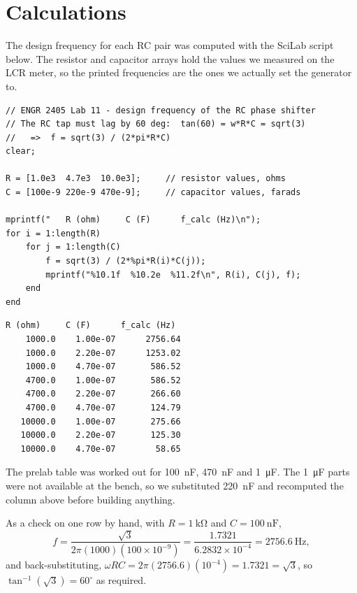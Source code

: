 \documentclass[11pt]{article}
\begin{document}
\section*{Calculations}
The design frequency for each RC pair was computed with the SciLab script below.
The resistor and capacitor arrays hold the values we measured on the LCR meter,
so the printed frequencies are the ones we actually set the generator to.

\begin{lstlisting}[style=scilab, caption={SciLab program \texttt{lab11\_freq.sce}.}]
// ENGR 2405 Lab 11 - design frequency of the RC phase shifter
// The RC tap must lag by 60 deg:  tan(60) = w*R*C = sqrt(3)
//   =>  f = sqrt(3) / (2*pi*R*C)
clear;

R = [1.0e3  4.7e3  10.0e3];     // resistor values, ohms
C = [100e-9 220e-9 470e-9];     // capacitor values, farads

mprintf("   R (ohm)     C (F)      f_calc (Hz)\n");
for i = 1:length(R)
    for j = 1:length(C)
        f = sqrt(3) / (2*%pi*R(i)*C(j));
        mprintf("%10.1f  %10.2e  %11.2f\n", R(i), C(j), f);
    end
end
\end{lstlisting}

\begin{lstlisting}[style=console, caption={SciLab runtime output.}]
   R (ohm)     C (F)      f_calc (Hz)
    1000.0    1.00e-07      2756.64
    1000.0    2.20e-07      1253.02
    1000.0    4.70e-07       586.52
    4700.0    1.00e-07       586.52
    4700.0    2.20e-07       266.60
    4700.0    4.70e-07       124.79
   10000.0    1.00e-07       275.66
   10000.0    2.20e-07       125.30
   10000.0    4.70e-07        58.65
\end{lstlisting}

The prelab table was worked out for \qty{100}{\nano\farad}, \qty{470}{\nano\farad}
and \qty{1}{\micro\farad}. The \qty{1}{\micro\farad} parts were not available at
the bench, so we substituted \qty{220}{\nano\farad} and recomputed the column
above before building anything.

As a check on one row by hand, with $R = \qty{1}{\kilo\ohm}$ and
$C = \qty{100}{\nano\farad}$,
\[
    f = \frac{\sqrt{3}}{2\pi(1000)(100\times10^{-9})}
      = \frac{1.7321}{6.2832\times10^{-4}} = \qty{2756.6}{\hertz},
\]
and back-substituting, $\omega RC = 2\pi(2756.6)(10^{-4}) = 1.7321 = \sqrt{3}$,
so $\tan^{-1}(\sqrt{3}) = 60^{\circ}$ as required.
\end{document}
